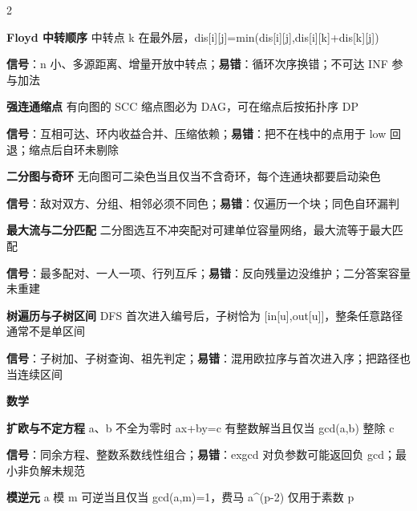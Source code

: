 \documentclass[UTF8,fontset=fandol,a4paper,twoside]{ctexart}
\newcommand{\topic}[1]{\par\smallskip\textbf{#1}\par\nobreak}
\begin{document}
\begin{multicols}{2}
\par\textbf{Floyd 中转顺序}\quad
中转点 k 在最外层，dis[\allowbreak{}i]\allowbreak{}[\allowbreak{}j]\allowbreak{}=\allowbreak{}min(\allowbreak{}dis[\allowbreak{}i]\allowbreak{}[\allowbreak{}j]\allowbreak{},\allowbreak{}dis[\allowbreak{}i]\allowbreak{}[\allowbreak{}k]\allowbreak{}+\allowbreak{}dis[\allowbreak{}k]\allowbreak{}[\allowbreak{}j]\allowbreak{})\allowbreak{}\par
\textbf{信号}：n 小、多源距离、增量开放中转点；\textbf{易错}：循环次序换错；不可达 INF 参与加法\par
\par\textbf{强连通缩点}\quad
有向图的 SCC 缩点图必为 DAG，可在缩点后按拓扑序 DP\par
\textbf{信号}：互相可达、环内收益合并、压缩依赖；\textbf{易错}：把不在栈中的点用于 low 回退；缩点后自环未剔除\par
\par\textbf{二分图与奇环}\quad
无向图可二染色当且仅当不含奇环，每个连通块都要启动染色\par
\textbf{信号}：敌对双方、分组、相邻必须不同色；\textbf{易错}：仅遍历一个块；同色自环漏判\par
\par\textbf{最大流与二分匹配}\quad
二分图选互不冲突配对可建单位容量网络，最大流等于最大匹配\par
\textbf{信号}：最多配对、一人一项、行列互斥；\textbf{易错}：反向残量边没维护；二分答案容量未重建\par
\par\textbf{树遍历与子树区间}\quad
DFS 首次进入编号后，子树恰为 [\allowbreak{}in[\allowbreak{}u]\allowbreak{},\allowbreak{}out[\allowbreak{}u]\allowbreak{}]\allowbreak{}，整条任意路径通常不是单区间\par
\textbf{信号}：子树加、子树查询、祖先判定；\textbf{易错}：混用欧拉序与首次进入序；把路径也当连续区间\par
\topic{数学}
\par\textbf{扩欧与不定方程}\quad
a、b 不全为零时 ax+\allowbreak{}by=\allowbreak{}c 有整数解当且仅当 gcd(\allowbreak{}a,\allowbreak{}b)\allowbreak{} 整除 c\par
\textbf{信号}：同余方程、整数系数线性组合；\textbf{易错}：exgcd 对负参数可能返回负 gcd；最小非负解未规范\par
\par\textbf{模逆元}\quad
a 模 m 可逆当且仅当 gcd(\allowbreak{}a,\allowbreak{}m)\allowbreak{}=\allowbreak{}1，费马 a\textasciicircum{}(\allowbreak{}p-\allowbreak{}2)\allowbreak{} 仅用于素数 p\par

\end{multicols}
\end{document}

